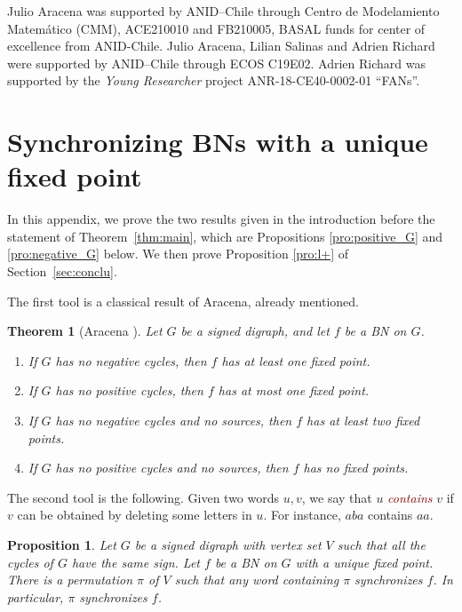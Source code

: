 \documentclass[11pt,letter]{article}
\newtheorem{proposition}{Proposition}
\newtheorem{theorem}{Theorem}
\newcommand{\EM}[1]{{\em\textcolor{Maroon}{#1}}}
\begin{document}
Julio Aracena was supported by ANID–Chile through Centro de Modelamiento Matemático (CMM), ACE210010 and FB210005, BASAL funds for center of excellence from ANID-Chile. Julio Aracena, Lilian Salinas and Adrien Richard were supported by ANID–Chile through ECOS C19E02. Adrien Richard was supported by 
the \emph{Young Researcher} project ANR-18-CE40-0002-01 ``FANs''.


\appendix

\section{Synchronizing BNs with a unique fixed point}\label{app:one_fixed_point}

In this appendix, we prove the two results given in the introduction before the statement of Theorem~\ref{thm:main}, which are Propositions \ref{pro:positive_G} and \ref{pro:negative_G} below. We then prove Proposition \ref{pro:l+} of Section~\ref{sec:conclu}. 

\medskip
The first tool is a classical result of Aracena, already mentioned. 

\begin{theorem}[Aracena \cite{A08}]\label{thm:A08}
Let $G$ be a signed digraph, and let $f$ be a BN on $G$.
\begin{enumerate}
\item If $G$ has no negative cycles, then $f$ has at least one fixed point. 
\item If $G$ has no positive cycles, then $f$ has at most one fixed point. 
\item If $G$ has no negative cycles and no sources, then $f$ has at least two fixed points. 
\item If $G$ has no positive cycles and no sources, then $f$ has no fixed points. 
\end{enumerate}
\end{theorem}

The second tool is the following. Given two words $u,v$, we say that $u$ \EM{contains} $v$ if $v$ can be obtained by deleting some letters in $u$. For instance, $aba$ contains $aa$. 

\begin{proposition}\label{pro:same_sign}
Let $G$ be a signed digraph with vertex set $V$ such that all the cycles of $G$ have the same sign. Let $f$ be a BN on $G$ with a unique fixed point. There is a permutation $\pi$ of $V$ such that any word containing $\pi$ synchronizes $f$. In particular, $\pi$ synchronizes $f$.
\end{proposition}
\end{document}
